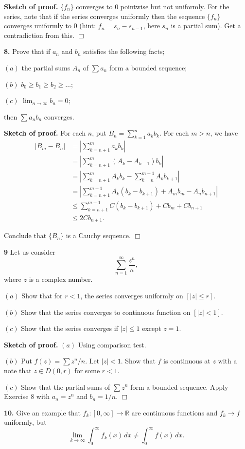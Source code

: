 \documentclass{article}
\begin{document}
\textbf{Sketch of proof.} $\{f_n\}$ converges to $0$ pointwise but not
uniformly. For the series, note that if the series converges uniformly
then the sequence $\{f_n\}$ converges uniformly to $0$ (hint:
$f_n=s_n-s_{n-1}$, here $s_n$ is a partial sum). Get a contradiction
from this. $\Box$

    \textbf{8.} Prove that if $a_n$ and $b_n$ satisfies the following facts;

$(a)$ the partial sums $A_n$ of $\sum a_n$ form a bounded sequence;

$(b)$ $b_0\ge b_1\ge b_2\ge \ldots$;

$(c)$ $\lim_{n\to\infty}b_n = 0$;

then $\sum a_nb_n$ converges.

\textbf{Sketch of proof.} For each $n$, put $B_n = \sum_{k=1}^na_kb_k$.
For each $m > n$, we have \[\begin{aligned}
|B_m-B_n| &= \left|\sum_{k=n+1}^ma_kb_k\right|\\
&= \left| \sum_{k=n+1}^m (A_k-A_{k-1})b_k\right|\\
&= \left| \sum_{k=n+1}^m A_kb_k - \sum_{k=n}^{m-1} A_kb_{k+1}\right|\\
&= \left| \sum_{k=n+1}^{m-1}A_k(b_k-b_{k+1}) + A_mb_m - A_nb_{n+1}\right|\\
&\le \sum_{k=n+1}^{m-1} C(b_k- b_{k+1}) + Cb_m + Cb_{n+1} \\
&\le 2Cb_{n+1}.
\end{aligned}\]

Conclude that $\{B_n\}$ is a Cauchy sequence. $\Box$

    \textbf{9} Let us consider \[\sum_{n=1}^{\infty}\frac{z^n}{n},\] where
$z$ is a complex number.

$(a)$ Show that for $r < 1$, the series converges uniformly on
$[|z|\le r]$.

$(b)$ Show that the series converges to continuous function on
$[|z| < 1]$.

$(c)$ Show that the series converges if $|z|\le 1$ except $z=1$.

\textbf{Sketch of proof.} $(a)$ Using comparison test.

$(b)$ Put $f(z) = \sum z^n/n$. Let $|z| < 1$. Show that $f$ is
continuous at $z$ with a note that $z\in D(0,r)$ for some $r < 1$.

$(c)$ Show that the partial sums of $\sum z^n$ form a bounded sequence.
Apply Exercise 8 with $a_n = z^n$ and $b_n = 1/n$. $\Box$

    \textbf{10.} Give an example that $f_k:[0,\infty]\to\mathbb{R}$ are
continuous functions and $f_k \to f$ uniformly, but \[
\lim_{k\to\infty}\int_0^{\infty}f_k(x)\,dx \ne \int_0^{\infty} f(x)\,dx.
\]
\end{document}
